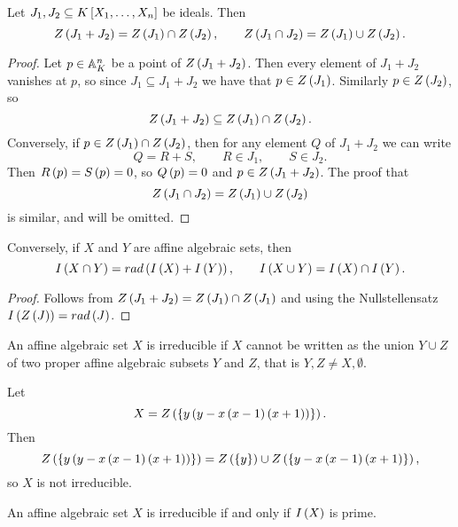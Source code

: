 \begin{proposition}
Let $ J_1, J_2 \subseteq K\sb{X_1, \dots, X_n} $ be ideals. Then
$$ Z\rb{J_1 + J_2} = Z\rb{J_1} \cap Z\rb{J_2}, \qquad Z\rb{J_1 \cap J_2} = Z\rb{J_1} \cup Z\rb{J_2}. $$
\end{proposition}

\begin{proof}
Let $ p \in \A_K^n $ be a point of $ Z\rb{J_1 + J_2} $. Then every element of $ J_1 + J_2 $ vanishes at $ p $, so since $ J_1 \subseteq J_1 + J_2 $ we have that $ p \in Z\rb{J_1} $. Similarly $ p \in Z\rb{J_2} $, so
$$ Z\rb{J_1 + J_2} \subseteq Z\rb{J_1} \cap Z\rb{J_2}. $$
Conversely, if $ p \in Z\rb{J_1} \cap Z\rb{J_2} $, then for any element $ Q $ of $ J_1 + J_2 $ we can write
$$ Q = R + S, \qquad R \in J_1, \qquad S \in J_2. $$
Then $ R\rb{p} = S\rb{p} = 0 $, so $ Q\rb{p} = 0 $ and $ p \in Z\rb{J_1 + J_2} $. The proof that
$$ Z\rb{J_1 \cap J_2} = Z\rb{J_1} \cup Z\rb{J_2} $$
is similar, and will be omitted.
\end{proof}

\begin{corollary}
Conversely, if $ X $ and $ Y $ are affine algebraic sets, then
$$ I\rb{X \cap Y} = rad\rb{I\rb{X} + I\rb{Y}}, \qquad I\rb{X \cup Y} = I\rb{X} \cap I\rb{Y}. $$
\end{corollary}

\begin{proof}
Follows from $ Z\rb{J_1 + J_2} = Z\rb{J_1} \cap Z\rb{J_1} $ and using the Nullstellensatz $ I\rb{Z\rb{J}} = rad\rb{J} $.
\end{proof}

\begin{definition}
An affine algebraic set $ X $ is irreducible if $ X $ cannot be written as the union $ Y \cup Z $ of two proper affine algebraic subsets $ Y $ and $ Z $, that is $ Y, Z \ne X, \emptyset $.
\end{definition}

\begin{example2}
Let
$$ X = Z\rb{\cb{y\rb{y - x\rb{x - 1}\rb{x + 1}}}}. $$
Then
$$ Z\rb{\cb{y\rb{y - x\rb{x - 1}\rb{x + 1}}}} = Z\rb{\cb{y}} \cup Z\rb{\cb{y - x\rb{x - 1}\rb{x + 1}}}, $$
so $ X $ is not irreducible.
\end{example2}

\begin{proposition}
An affine algebraic set $ X $ is irreducible if and only if $ I\rb{X} $ is prime.
\end{proposition}

